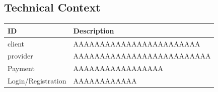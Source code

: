 \subsection{Technical Context}

\begin{table}[H]
    \begin{tabularx}{\textwidth}{lX}
    \toprule
    ID & Description   \\
    \midrule
    \gls{client} & AAAAAAAAAAAAAAAAAAAAAAAA \\
    \gls{provider} & AAAAAAAAAAAAAAAAAAAAAAAAAA \\
    Payment & AAAAAAAAAAAAAAAAA \\
    Login/Registration & AAAAAAAAAAAA  \\
    \bottomrule
    \end{tabularx}
\end{table}